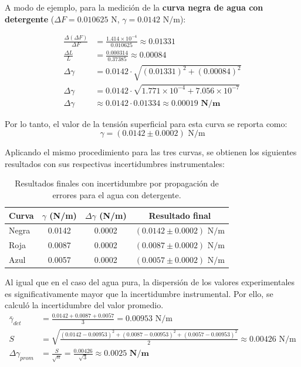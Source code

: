 \documentclass[11pt,a4paper]{article}
\begin{document}
A modo de ejemplo, para la medición de la \textbf{curva negra de agua con detergente} (\(\Delta F = 0.010625 \text{ N}\), \(\gamma = 0.0142 \text{ N/m}\)):

\begin{align*}
    \frac{\Delta (\Delta F)}{\Delta F} &= \frac{1.414 \times 10^{-4}}{0.010625} \approx 0.01331 \\
    \frac{\Delta L}{L} &= \frac{0.000314}{0.37385} \approx 0.00084 \\
    \Delta \gamma &= 0.0142 \cdot \sqrt{(0.01331)^2 + (0.00084)^2} \\
    \Delta \gamma &= 0.0142 \cdot \sqrt{1.771 \times 10^{-4} + 7.056 \times 10^{-7}} \\
    \Delta \gamma &\approx 0.0142 \cdot 0.01334 \approx \mathbf{0.00019 \text{ N/m}}
\end{align*}

Por lo tanto, el valor de la tensión superficial para esta curva se reporta como:
\begin{equation*}
    \gamma = (0.0142 \pm 0.0002) \text{ N/m}
\end{equation*}

Aplicando el mismo procedimiento para las tres curvas, se obtienen los siguientes resultados con sus respectivas incertidumbres instrumentales:

\begin{table}[H]
    \centering
    \label{tab:resultados_incertidumbre_detergente}
    \begin{tabular}{@{}lccc@{}}
        \toprule
        \textbf{Curva} & \textbf{\(\gamma\) (N/m)} & \textbf{\(\Delta \gamma\) (N/m)} & \textbf{Resultado final} \\ \midrule
        Negra & 0.0142 & 0.0002 & \((0.0142 \pm 0.0002) \text{ N/m}\) \\
        Roja  & 0.0087 & 0.0002 & \((0.0087 \pm 0.0002) \text{ N/m}\) \\
        Azul  & 0.0057 & 0.0002 & \((0.0057 \pm 0.0002) \text{ N/m}\) \\ \bottomrule
    \end{tabular}
    \caption{Resultados finales con incertidumbre por propagación de errores para el agua con detergente.}
\end{table}

Al igual que en el caso del agua pura, la dispersión de los valores experimentales es significativamente mayor que la incertidumbre instrumental. Por ello, se calculó la incertidumbre del valor promedio.
\begin{align*}
    \bar{\gamma}_{det} &= \frac{0.0142 + 0.0087 + 0.0057}{3} = 0.00953 \text{ N/m} \\
    S &= \sqrt{\frac{(0.0142-0.00953)^2 + (0.0087-0.00953)^2 + (0.0057-0.00953)^2}{2}} \approx 0.00426 \text{ N/m} \\
    \Delta \gamma_{prom} &= \frac{S}{\sqrt{n}} = \frac{0.00426}{\sqrt{3}} \approx \mathbf{0.0025 \text{ N/m}}
\end{align*}
\end{document}
